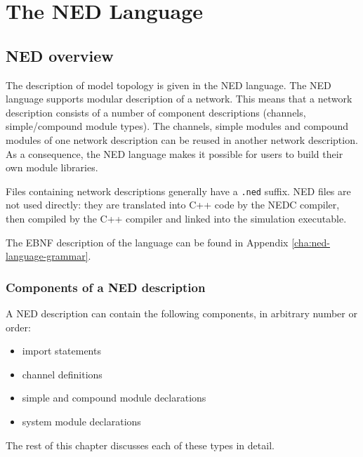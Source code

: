 \chapter{The NED Language}
\label{cha:the-ned-language}


\section{NED overview}

The description of model topology is given in the NED
language. The NED language supports modular
description of a network. This means that a network
description consists of a number of
component descriptions (channels,
simple/compound module
types). The channels, simple modules and compound
modules of one network description can be reused in another network
description. As a consequence, the NED language makes it possible for
users to build their own module libraries.


Files containing network descriptions generally have a \texttt{.ned}
suffix.  NED files are not used directly: they are
translated into C++ code by the NEDC compiler, then compiled by the
C++ compiler and linked into the simulation executable.


The EBNF description of the language can be found in Appendix
\ref{cha:ned-language-grammar}.





\subsection{Components of a NED description}

A NED description can contain the following components, in arbitrary
number or order:
\begin{itemize}
  \item{import statements}
  \item{channel definitions}
  \item{simple and compound module declarations}
  \item{system module declarations}
\end{itemize}

The rest of this chapter discusses each of these types in detail.





